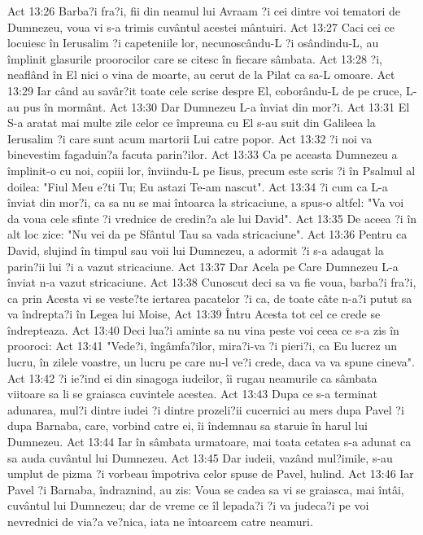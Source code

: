 Act 13:26  Barba?i fra?i, fii din neamul lui Avraam ?i cei dintre voi tematori de Dumnezeu, voua vi s-a trimis cuvântul acestei mântuiri.
Act 13:27  Caci cei ce locuiesc în Ierusalim ?i capeteniile lor, necunoscându-L ?i osândindu-L, au împlinit glasurile proorocilor care se citesc în fiecare sâmbata.
Act 13:28  ?i, neaflând în El nici o vina de moarte, au cerut de la Pilat ca sa-L omoare.
Act 13:29  Iar când au savâr?it toate cele scrise despre El, coborându-L de pe cruce, L-au pus în mormânt.
Act 13:30  Dar Dumnezeu L-a înviat din mor?i.
Act 13:31  El S-a aratat mai multe zile celor ce împreuna cu El s-au suit din Galileea la Ierusalim ?i care sunt acum martorii Lui catre popor.
Act 13:32  ?i noi va binevestim fagaduin?a facuta parin?ilor.
Act 13:33  Ca pe aceasta Dumnezeu a împlinit-o cu noi, copiii lor, înviindu-L pe Iisus, precum este scris ?i în Psalmul al doilea: "Fiul Meu e?ti Tu; Eu astazi Te-am nascut".
Act 13:34  ?i cum ca L-a înviat din mor?i, ca sa nu se mai întoarca la stricaciune, a spus-o altfel: "Va voi da voua cele sfinte ?i vrednice de credin?a ale lui David".
Act 13:35  De aceea ?i în alt loc zice: "Nu vei da pe Sfântul Tau sa vada stricaciune".
Act 13:36  Pentru ca David, slujind în timpul sau voii lui Dumnezeu, a adormit ?i s-a adaugat la parin?ii lui ?i a vazut stricaciune.
Act 13:37  Dar Acela pe Care Dumnezeu L-a înviat n-a vazut stricaciune.
Act 13:38  Cunoscut deci sa va fie voua, barba?i fra?i, ca prin Acesta vi se veste?te iertarea pacatelor ?i ca, de toate câte n-a?i putut sa va îndrepta?i în Legea lui Moise,
Act 13:39  Întru Acesta tot cel ce crede se îndrepteaza.
Act 13:40  Deci lua?i aminte sa nu vina peste voi ceea ce s-a zis în prooroci:
Act 13:41  "Vede?i, îngâmfa?ilor, mira?i-va ?i pieri?i, ca Eu lucrez un lucru, în zilele voastre, un lucru pe care nu-l ve?i crede, daca va va spune cineva".
Act 13:42  ?i ie?ind ei din sinagoga iudeilor, îi rugau neamurile ca sâmbata viitoare sa li se graiasca cuvintele acestea.
Act 13:43  Dupa ce s-a terminat adunarea, mul?i dintre iudei ?i dintre prozeli?ii cucernici au mers dupa Pavel ?i dupa Barnaba, care, vorbind catre ei, îi îndemnau sa staruie în harul lui Dumnezeu.
Act 13:44  Iar în sâmbata urmatoare, mai toata cetatea s-a adunat ca sa auda cuvântul lui Dumnezeu.
Act 13:45  Dar iudeii, vazând mul?imile, s-au umplut de pizma ?i vorbeau împotriva celor spuse de Pavel, hulind.
Act 13:46  Iar Pavel ?i Barnaba, îndraznind, au zis: Voua se cadea sa vi se graiasca, mai întâi, cuvântul lui Dumnezeu; dar de vreme ce îl lepada?i ?i va judeca?i pe voi nevrednici de via?a ve?nica, iata ne întoarcem catre neamuri.
